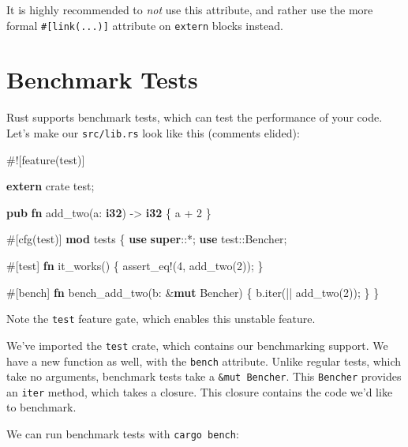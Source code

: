 \documentclass[a4paper,]{book}
\newenvironment{Shaded}{\begin{snugshade}}{\end{snugshade}}
\newcommand{\KeywordTok}[1]{\textcolor[rgb]{0.13,0.29,0.53}{\textbf{{#1}}}}
\newcommand{\DecValTok}[1]{\textcolor[rgb]{0.00,0.00,0.81}{{#1}}}
\newcommand{\OtherTok}[1]{\textcolor[rgb]{0.56,0.35,0.01}{{#1}}}
\newcommand{\NormalTok}[1]{{#1}}
\begin{document}
It is highly recommended to \emph{not} use this attribute, and rather
use the more formal \texttt{\#{[}link(...){]}} attribute on
\texttt{extern} blocks instead.

\section{Benchmark Tests}\label{sec--benchmark-tests}

Rust supports benchmark tests, which can test the performance of your
code. Let's make our \texttt{src/lib.rs} look like this (comments
elided):

\begin{Shaded}
\begin{Highlighting}[]
\NormalTok{#![feature(test)]}

\KeywordTok{extern} \NormalTok{crate test;}

\KeywordTok{pub} \KeywordTok{fn} \NormalTok{add_two(a: }\KeywordTok{i32}\NormalTok{) -> }\KeywordTok{i32} \NormalTok{\{}
    \NormalTok{a + }\DecValTok{2}
\NormalTok{\}}

\OtherTok{#[}\NormalTok{cfg}\OtherTok{(}\NormalTok{test}\OtherTok{)]}
\KeywordTok{mod} \NormalTok{tests \{}
    \KeywordTok{use} \KeywordTok{super}\NormalTok{::*;}
    \KeywordTok{use} \NormalTok{test::Bencher;}

    \OtherTok{#[}\NormalTok{test}\OtherTok{]}
    \KeywordTok{fn} \NormalTok{it_works() \{}
        \OtherTok{assert_eq!}\NormalTok{(}\DecValTok{4}\NormalTok{, add_two(}\DecValTok{2}\NormalTok{));}
    \NormalTok{\}}

    \OtherTok{#[}\NormalTok{bench}\OtherTok{]}
    \KeywordTok{fn} \NormalTok{bench_add_two(b: &}\KeywordTok{mut} \NormalTok{Bencher) \{}
        \NormalTok{b.iter(|| add_two(}\DecValTok{2}\NormalTok{));}
    \NormalTok{\}}
\NormalTok{\}}
\end{Highlighting}
\end{Shaded}

Note the \texttt{test} feature gate, which enables this unstable
feature.

We've imported the \texttt{test} crate, which contains our benchmarking
support. We have a new function as well, with the \texttt{bench}
attribute. Unlike regular tests, which take no arguments, benchmark
tests take a \texttt{\&mut\ Bencher}. This \texttt{Bencher} provides an
\texttt{iter} method, which takes a closure. This closure contains the
code we'd like to benchmark.

We can run benchmark tests with \texttt{cargo\ bench}:
\end{document}
